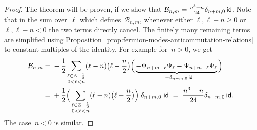 \documentclass[12pt,oneside,english]{amsart}
\numberwithin{equation}{section}
\numberwithin{figure}{section}
\theoremstyle{plain}
\theoremstyle{plain}
\theoremstyle{plain}
\theoremstyle{plain}
\theoremstyle{remark}
\theoremstyle{definition}
\theoremstyle{plain}
\theoremstyle{plain}
\numberwithin{thm}{section}
\begin{document}
\begin{proof}
The theorem will be proven, if we show that
$\mathcal{B}_{n,m} = \frac{n^3-n}{24} \delta_{n+m,0} \, \mathsf{id}$.
Note that in the 
sum over~$\ell$ which defines~$\mathcal{B}_{n,m}$, whenever either
$\ell , \ell -n \geq 0$ or
$\ell , \ell -n < 0$ the two terms directly cancel. The finitely many 
remaining terms are simplified
using Proposition~\ref{prop:fermion-modes-anticommutation-relations} to 
constant multiples of the identity. For example for~$n > 0$, we 
get
\begin{align*}
\mathcal{B}_{n,m}
= \; & - \frac{1}{2} \sum_{\substack{\ell\in\mathbb{Z} +\frac{1}{2} \\ 0 < \ell < n}} 
	    (\ell - n) \big( \ell-\frac{n}{2} \big) \Big( \underbrace{
	        - {\Psi}_{n+m-\ell}{\Psi}_{\ell}
	        - {\Psi}_{n+m-\ell}{\Psi}_{\ell} }_{
					= - \delta_{n+m,0} \, \mathsf{id} } \Big) \\
= \; & + \frac{1}{2}
    \Big( \sum_{\substack{\ell\in\mathbb{Z} +\frac{1}{2} \\ 0 < \ell < n}} 
	    (\ell - n) \big( \ell-\frac{n}{2} \big) \Big) \; \delta_{n+m,0} \; \mathsf{id} 
\; = \; \frac{n^3-n}{24} \delta_{n+m,0} \, \mathsf{id} .
\end{align*}
The case~$n<0$ is similar.

\end{proof}
\end{document}
